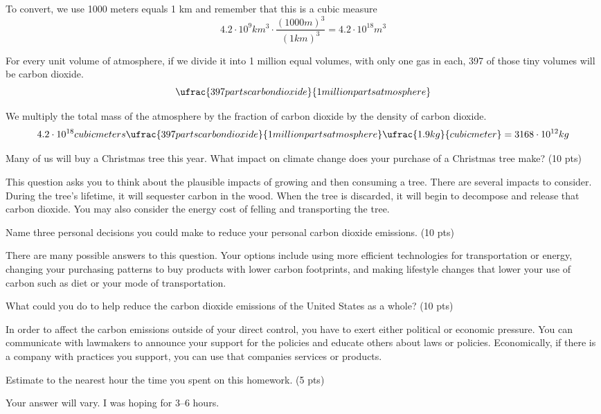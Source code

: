 To convert, we use 1000 meters equals 1 km and remember that this is a
cubic measure
$$ 4.2 \cdot 10^9 km^3 \cdot \frac{(1000m)^3}{(1km)^3} = 4.2 \cdot
10^{18} m^3$$

For every unit volume of atmosphere, if we divide it into 1 million
equal volumes, with only one gas in each, 397 of those tiny volumes will
be carbon dioxide.
$$ \ufrac{397 parts carbon dioxide}{1 million parts atmosphere} $$

We multiply the total mass of the atmosphere by the fraction of carbon
dioxide by the density of carbon dioxide.
$$ 4.2 \cdot 10^{18} cubic meters
\ufrac{397 parts carbon dioxide}{1 million parts atmosphere}
\ufrac{1.9 kg}{cubic meter} = 3168 \cdot 10^{12} kg$$



Many of us will buy a Christmas tree this year.  What impact on climate
change does your purchase of a Christmas tree make? (10 pts)

This question asks you to think about the plausible impacts of growing
and then consuming a tree.  There are several impacts to consider.
During the tree's lifetime, it will sequester carbon in the wood.  When
the tree is discarded, it will begin to decompose and release that
carbon dioxide.  You may also consider the energy cost of felling and
transporting the tree.



Name three personal decisions you could make to reduce your personal
carbon dioxide emissions. (10 pts)



There are many possible answers to this question.  Your options include
using more efficient technologies for transportation or energy, changing
your purchasing patterns to buy products with lower carbon footprints,
and making lifestyle changes that lower your use of carbon such as diet
or your mode of transportation.



What could you do to help reduce the carbon dioxide emissions of the United
States as a whole? (10 pts)

In order to affect the carbon emissions outside of your direct control,
you have to exert either political or economic pressure.  You can
communicate with lawmakers to announce your support for the policies and
educate others about laws or policies.  Economically, if there is a
company with practices you support, you can use that companies services
or products.


Estimate to the nearest hour the time you spent on this homework. (5
pts)


Your answer will vary.  I was hoping for 3--6 hours.
